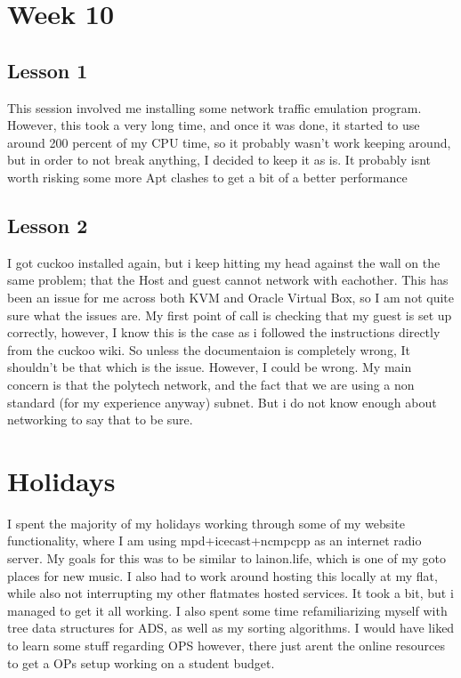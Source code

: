 \documentclass{article}
\begin{document}
\section{Week 10}
\subsection{Lesson 1}
This session involved me installing some network traffic emulation program. However, this took a very long time, and once it was done, it started to use around 200 percent of my CPU time, so it probably wasn't work keeping around, but in order to not break anything, I decided to keep it as is. It probably isnt worth risking some more Apt clashes to get a bit of a better performance
\subsection{Lesson 2}
I got cuckoo installed again, but i keep hitting my head against the wall on the same problem; that the Host and guest cannot network with eachother. This has been an issue for me across both KVM and Oracle Virtual Box, so I am not quite sure what the issues are. My first point of call is checking that my guest is set up correctly, however, I know this is the case as i followed the instructions directly from the cuckoo wiki. So unless the documentaion is completely wrong, It shouldn't be that which is the issue. However, I could be wrong. My main concern is that the polytech network, and the fact that we are using a non standard (for my experience anyway) subnet. But i do not know enough about networking to say that to be sure. 


\section*{Holidays}
I spent the majority of my holidays working through some of my website functionality, where I am using mpd+icecast+ncmpcpp as an internet radio server. My goals for this was to be similar to lainon.life, which is one of my goto places for new music. I also had to work around hosting this locally at my flat, while also not interrupting my other flatmates hosted services. It took a bit, but i managed to get it all working. I also spent some time refamiliarizing myself with tree data structures for ADS, as well as my sorting algorithms. I would have liked to learn some stuff regarding OPS however, there just arent the online resources to get a OPs setup working on a student budget. 
\end{document}
